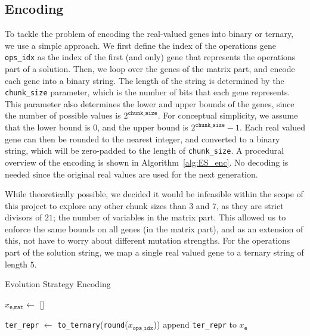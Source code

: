 \documentclass{article}
\begin{document}
\subsection{Encoding}
\label{sec:ES_enc}
\vspace{-0.2cm}
To tackle the problem of encoding the real-valued genes into binary or ternary, we use a simple approach.
We first define the index of the operations gene \texttt{ops\_idx} as the index of the first (and only) gene that represents the operations part of a solution.
Then, we loop over the genes of the matrix part, and encode each gene into a binary string.
The length of the string is determined by the \texttt{chunk\_size} parameter, which is the number of bits that each gene represents.
This parameter also determines the lower and upper bounds of the genes, since the number of possible values is $2^{\texttt{chunk\_size}}$.
For conceptual simplicity, we assume that the lower bound is 0, and the upper bound is $2^{\texttt{chunk\_size}}-1$.
Each real valued gene can then be rounded to the nearest integer, and converted to a binary string, which will be zero-padded to the length of \texttt{chunk\_size}.
A procedural overview of the encoding is shown in Algorithm~\ref{alg:ES_enc}.
No decoding is needed since the original real values are used for the next generation.

While theoretically possible, we decided it would be infeasible within the scope of this project to explore any other chunk sizes than $3$ and $7$, as they are strict divisors of $21$; the number of variables in the matrix part.
This allowed us to enforce the same bounds on all genes (in the matrix part), and as an extension of this, not have to worry about different mutation strengths.
For the operations part of the solution string, we map a single real valued gene to a ternary string of length $5$.

\vspace{-0.3cm}
\begin{algorithm}[htbp]

    \caption{Evolution Strategy Encoding}
    \label{alg:ES_enc}
    \SetAlgoLined
    \DontPrintSemicolon


    \BlankLine

    $x_{\texttt{e}, \texttt{mat}} \gets$ []\;

    \texttt{ter\_repr} $\gets$ \texttt{to\_ternary}(\texttt{round}($x_{\texttt{ops\_idx}}$))\;
    append \texttt{ter\_repr} to $x_\texttt{e}$\;

    \BlankLine


\end{algorithm}
\end{document}
